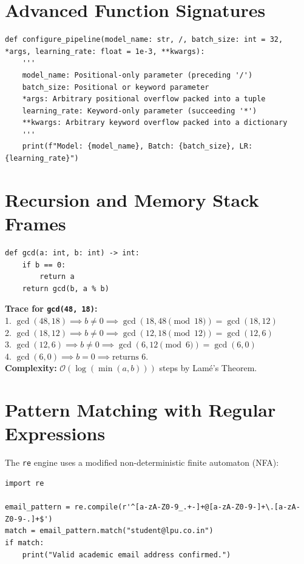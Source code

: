 \section{Advanced Function Signatures}
\begin{lstlisting}
def configure_pipeline(model_name: str, /, batch_size: int = 32, *args, learning_rate: float = 1e-3, **kwargs):
    '''
    model_name: Positional-only parameter (preceding '/')
    batch_size: Positional or keyword parameter
    *args: Arbitrary positional overflow packed into a tuple
    learning_rate: Keyword-only parameter (succeeding '*')
    **kwargs: Arbitrary keyword overflow packed into a dictionary
    '''
    print(f"Model: {model_name}, Batch: {batch_size}, LR: {learning_rate}")
\end{lstlisting}

\section{Recursion and Memory Stack Frames}
\begin{example}
\begin{lstlisting}
def gcd(a: int, b: int) -> int:
    if b == 0:
        return a
    return gcd(b, a % b)
\end{lstlisting}
\end{example}
\begin{solutionbox}
\textbf{Trace for \texttt{gcd(48, 18)}:}\\
1. $\operatorname{gcd}(48, 18) \implies b \ne 0 \implies \operatorname{gcd}(18, 48 \pmod{18}) = \operatorname{gcd}(18, 12)$\\
2. $\operatorname{gcd}(18, 12) \implies b \ne 0 \implies \operatorname{gcd}(12, 18 \pmod{12}) = \operatorname{gcd}(12, 6)$\\
3. $\operatorname{gcd}(12, 6) \implies b \ne 0 \implies \operatorname{gcd}(6, 12 \pmod 6) = \operatorname{gcd}(6, 0)$\\
4. $\operatorname{gcd}(6, 0) \implies b = 0 \implies \text{returns } 6$.\\
\textbf{Complexity:} $\mathcal{O}(\log(\min(a, b)))$ steps by Lam\'e's Theorem.
\end{solutionbox}

\section{Pattern Matching with Regular Expressions}
The \texttt{re} engine uses a modified non-deterministic finite automaton (NFA):
\begin{lstlisting}
import re

email_pattern = re.compile(r'^[a-zA-Z0-9_.+-]+@[a-zA-Z0-9-]+\.[a-zA-Z0-9-.]+$')
match = email_pattern.match("student@lpu.co.in")
if match:
    print("Valid academic email address confirmed.")
\end{lstlisting}

